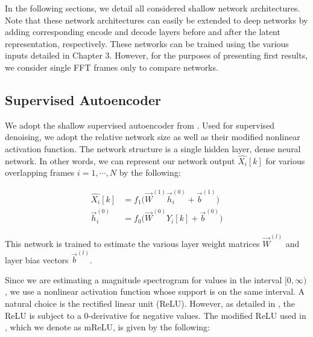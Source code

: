 In the following sections, we detail all considered shallow network architectures. Note that these network architectures can easily be extended to deep networks by adding corresponding encode and decode layers before and after the latent representation, respectively. These networks can be trained using the various inputs detailed in Chapter 3. However, for the purposes of presenting first results, we consider single FFT frames only to compare networks. %


\subsection{Supervised Autoencoder}

We adopt the shallow supervised autoencoder from \cite{liu2014experiments}. Used for supervised denoising, we adopt the relative network size as well as their modified nonlinear activation function. The network structure is a single hidden layer, dense neural network. In other words, we can represent our network output $\hat{X_i}[k]$ for various overlapping frames $i=1,\cdots,N$ by the following:


\begin{align}
\hat{X_i}[k] &= f_1 \big( \vec{W}^{(1)} \vec{h}_i^{(0)} + \vec{b}^{(1)} \big)\\
\vec{h}_i^{(0)} &= f_0 \big( \vec{W}^{(0)} Y_i[k] + \vec{b}^{(0)} \big)
\end{align}


This network is trained to estimate the various layer weight matrices $\vec{W}^{(l)}$ and layer bias vectors $\vec{b}^{(l)}$.

Since we are estimating a magnitude spectrogram for values in the interval $[0,\infty)$, we use a nonlinear activation function whose support is on the same interval. A natural choice is the rectified linear unit (ReLU). However, as detailed in \cite{liu2014experiments}, the ReLU is subject to a 0-derivative for negative values. The modified ReLU used in \cite{liu2014experiments}, which we denote as mReLU, is given by the following:

